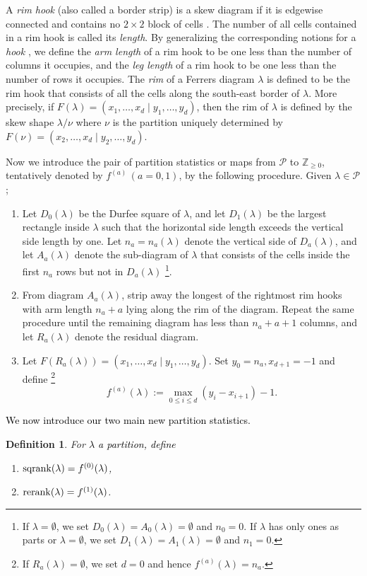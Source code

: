 \documentclass[sn-mathphys-num]{sn-jnl}%
\newcommand{\red}[1]{\textcolor{black}{#1}}
\theoremstyle{thmstyleone}%
\theoremstyle{thmstyletwo}%
\theoremstyle{thmstylethree}%
\newtheorem{definition}{Definition}%
\begin{document}
A {\em rim hook} (also called a border strip) is a skew diagram
if it is edgewise connected and contains no $2 \times 2$ block of cells \cite{Sagan2000}.
The number of all cells contained in a rim hook is called its {\em length}.
By generalizing the corresponding notions for a {\em hook} \cite{Sagan2000}, we define
the {\em arm length} of a rim hook to be one less than the number of columns
it occupies, and the {\em leg length} of a rim hook to be one less than the number of rows
it occupies.
The {\em rim} of a Ferrers diagram $\lambda$ is defined to be the rim hook that
consists of all the cells along the south-east border of $\lambda$.
More precisely, if $F(\lambda) = (x_1,\dots,x_d \mid y_1,\dots,y_d)$, then
the rim of $\lambda$ is defined by the skew shape $\lambda / \nu$ where
$\nu$ is the partition uniquely determined by 
$F(\nu) = (x_2,\dots,x_d \mid y_2,\dots,y_d)$.


Now we introduce the pair of partition statistics or maps
from $\mathscr{P}$ to $\mathbb{Z}_{\geq 0}$,
tentatively denoted by $f^{(a)} \, (a=0,1)$,
by the following procedure.
Given $\lambda \in \mathscr{P}$;
%
\begin{enumerate}
\item 
Let $D_0(\lambda)$ be the {Durfee square of} $\lambda$, 
and let $D_1(\lambda)$ be the largest rectangle inside $\lambda$ 
{such that the horizontal side length exceeds the vertical side length by one.}
Let $n_a = n_a(\lambda)$ denote the vertical side of $D_a(\lambda)$, and let
$A_a(\lambda)$ denote the sub-diagram of $\lambda$ that consists of 
the cells inside the first $n_a$ rows but not in $D_a(\lambda)$ 
%
\footnote{If $\lambda = \emptyset$,
we set $D_0(\lambda) = A_0(\lambda)=\emptyset$ and $n_0=0$. 
If $\lambda$ has only ones as parts or $\lambda = \emptyset$,
we set $D_1(\lambda) = A_1(\lambda)=\emptyset$ and $n_1=0$.}. 
%
\item From diagram $A_a(\lambda)$, 
strip away the longest of the rightmost rim hooks with arm length $n_a + a$
lying along the rim of the diagram.
Repeat the same procedure until the remaining diagram has less than $n_a+a+1$ columns, and
let $R_a(\lambda)$ denote the residual diagram.
%
\item Let $F(R_a(\lambda))=(x_1,\dots,x_d \mid y_1,\dots,y_d)$.
Set $y_0 = n_a, x_{d+1} = -1$ and define \footnote{If $R_a(\lambda) = \emptyset$, we set $d=0$ and hence $f^{(a)}(\lambda) =n_a$.}
\begin{equation*}
f^{(a)}(\lambda) := \max_{0 \leq i \leq d} (y_i -x_{i+1}) -1.
\end{equation*}
\end{enumerate}
\red{We now introduce our two main new partition statistics.}
\begin{definition}
For \red{$\lambda$ a partition, define}
\begin{enumerate}
\item ${\rm sqrank} (\lambda) = f^{(0)}(\lambda)$,
\item ${\rm rerank} (\lambda) = f^{(1)}(\lambda)$.
\end{enumerate}
\end{definition}
\end{document}
